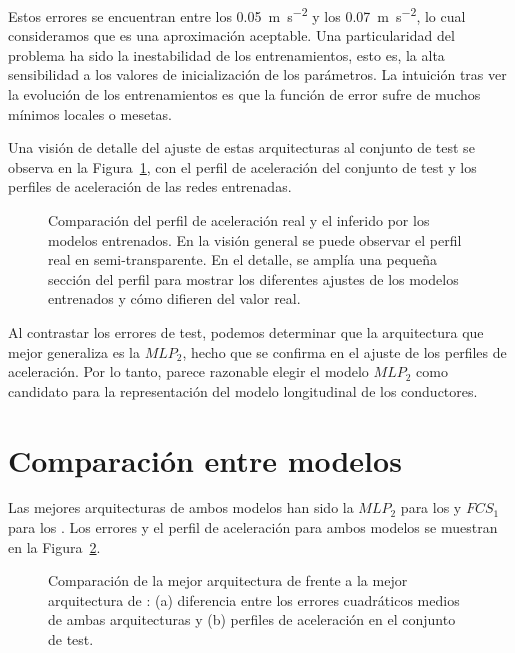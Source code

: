 Estos errores se encuentran entre los \SI{0.05}{\metre\per\square\second} y los \SI{0.07}{\metre\per\square\second}, lo cual consideramos que es una aproximación aceptable. Una particularidad del problema ha sido la inestabilidad de los entrenamientos, esto es, la alta sensibilidad a los valores de inicialización de los parámetros. La intuición tras ver la evolución de los entrenamientos es que la función de error sufre de muchos mínimos locales o mesetas.

Una visión de detalle del ajuste de estas arquitecturas al conjunto de test se observa en la Figura~\ref{fig:cf-mlp-test-comparisons}, con el perfil de aceleración del conjunto de test y los perfiles de aceleración de las redes entrenadas.

\begin{figure}
	\centering
	\qquad
	\caption[Comparación del perfil de aceleración real y el inferido por los modelos entrenados]{Comparación del perfil de aceleración real y el inferido por los modelos entrenados. En la visión general se puede observar el perfil real en semi-transparente. En el detalle, se amplía una pequeña sección del perfil para mostrar los diferentes ajustes de los modelos entrenados y cómo difieren del valor real.}
	\label{fig:cf-mlp-test-comparisons}
\end{figure}

Al contrastar los errores de test, podemos determinar que la arquitectura que mejor generaliza es la $MLP_2$, hecho que se confirma en el ajuste de los perfiles de aceleración. Por lo tanto, parece razonable elegir el modelo $MLP_2$ como candidato para la representación del modelo longitudinal de los conductores.

\section{Comparación entre modelos}

Las mejores arquitecturas de ambos modelos han sido la $MLP_2$ para los  y $FCS_1$ para los . Los errores y el perfil de aceleración para ambos modelos se muestran en la Figura~\ref{fig:cf-comparison-between-best-mlp-and-fcs-architecture}.

\begin{figure}
	\centering
	\qquad
	\caption[Comparación entre los dos tipos de modelo longitudinal]{Comparación de la mejor arquitectura de  frente a la mejor arquitectura de : (a) diferencia entre los errores cuadráticos medios de ambas arquitecturas y (b) perfiles de aceleración en el conjunto de test.}
	\label{fig:cf-comparison-between-best-mlp-and-fcs-architecture}
\end{figure}

